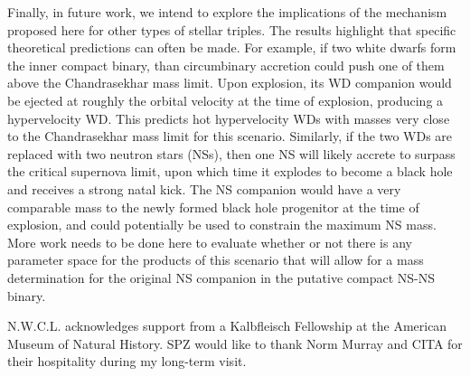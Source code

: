 \documentclass{aastex62}
\begin{document}
Finally, in future work, we intend to explore the implications of the mechanism proposed here for other types of stellar triples.  The results highlight that specific theoretical predictions can often be made.  For example, if two white dwarfs form the inner compact binary, than circumbinary accretion could push one of them above the Chandrasekhar mass limit.  Upon explosion, its WD companion would be ejected at roughly the orbital velocity at the time of explosion, producing a hypervelocity WD.  This predicts hot hypervelocity WDs with masses very close to the Chandrasekhar mass limit for this scenario.  Similarly, if the two WDs are replaced with two neutron stars (NSs), then one NS will likely accrete to surpass the critical supernova limit, upon which time it explodes to become a black hole and receives a strong natal kick.  The NS companion would have a very comparable mass to the newly formed black hole progenitor at the time of explosion, and could potentially be used to constrain the maximum NS mass.  More work needs to be done here to evaluate whether or not there is any parameter space for the products of this scenario that will allow for a mass determination for the original NS companion in the putative compact NS-NS binary.

\acknowledgments

N.W.C.L. acknowledges support from a Kalbfleisch Fellowship at the
American Museum of Natural History.  SPZ would like to thank Norm
Murray and CITA for their hospitality during my long-term visit.





%
% 
%      
\end{document}
